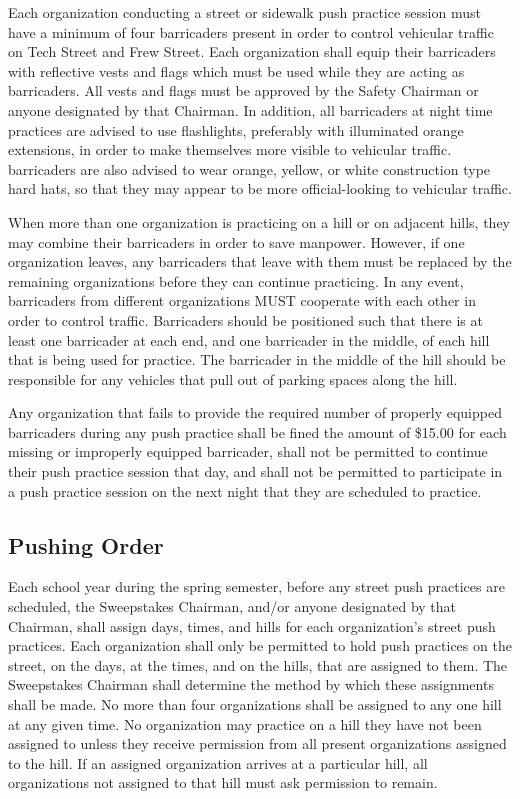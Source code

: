 	Each organization conducting a street or sidewalk push practice session must have a minimum of four barricaders present in order to control vehicular traffic on Tech Street and Frew Street. Each organization shall equip their barricaders with reflective vests and flags which must be used while they are acting as barricaders. All vests and flags must be approved by the Safety Chairman or anyone designated by that Chairman. In addition, all barricaders at night time practices are advised to use flashlights, preferably with illuminated orange extensions, in order to make themselves more visible to vehicular traffic. barricaders are also advised to wear orange, yellow, or white construction type hard hats, so that they may appear to be more official-looking to vehicular traffic.

	When more than one organization is practicing on a hill or on adjacent hills, they may combine their barricaders in order to save manpower. However, if one organization leaves, any barricaders that leave with them must be replaced by the remaining organizations before they can continue practicing. In any event, barricaders from different organizations MUST cooperate with each other in order to control traffic. Barricaders should be positioned such that there is at least one barricader at each end, and one barricader in the middle, of each hill that is being used for practice. The barricader in the middle of the hill should be responsible for any vehicles that pull out of parking spaces along the hill.

	Any organization that fails to provide the required number of properly equipped barricaders during any push practice shall be fined the amount of \$15.00 for each missing or improperly equipped barricader, shall not be permitted to continue their push practice session that day, and shall not be permitted to participate in a push practice session on the next night that they are scheduled to practice.

\subsection{Pushing Order}

	Each school year during the spring semester, before any street push practices are scheduled, the Sweepstakes Chairman, and/or anyone designated by that Chairman, shall assign days, times, and hills for each organization's street push practices. Each organization shall only be permitted to hold push practices on the street, on the days, at the times, and on the hills, that are assigned to them. The Sweepstakes Chairman shall determine the method by which these assignments shall be made. No more than four organizations shall be assigned to any one hill at any given time. No organization may practice on a hill they have not been assigned to unless they receive permission from all present organizations assigned to the hill. If an assigned organization arrives at a particular hill, all organizations not assigned to that hill must ask permission to remain.

